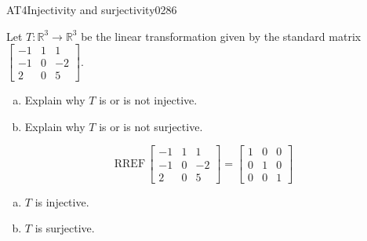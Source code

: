 \begin{exercise}{AT4}{Injectivity and surjectivity}{0286} 
\begin{exerciseStatement} 

 Let \(T:\mathbb{R}^3 \to \mathbb{R}^3\) be the linear transformation given by the standard matrix \(\left[\begin{array}{ccc}
-1 & 1 & 1 \\
-1 & 0 & -2 \\
2 & 0 & 5
\end{array}\right]\). 

 

\begin{enumerate}[(a)]
\item 

Explain why \(T\) is or is not injective.


\item 

Explain why \(T\) is or is not surjective.


\end{enumerate}

     \end{exerciseStatement}
 \begin{exerciseAnswer} 

\[\mathrm{RREF}\,\left[\begin{array}{ccc}
-1 & 1 & 1 \\
-1 & 0 & -2 \\
2 & 0 & 5
\end{array}\right]=\left[\begin{array}{ccc}
1 & 0 & 0 \\
0 & 1 & 0 \\
0 & 0 & 1
\end{array}\right]\]

 

\begin{enumerate}[(a)]
\item  

\(T\) is injective.

 
\item  

\(T\) is surjective.

 
\end{enumerate}

     \end{exerciseAnswer}
 \end{exercise}


\newpage




